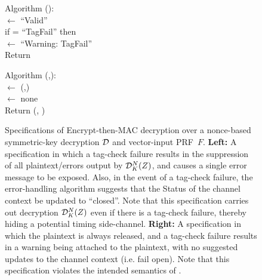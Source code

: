 \begin{figure}
{\medskip
Algorithm ():\\
\nudge {} $\gets$ ``Valid''\\
\nudge if  =  ``TagFail'' then\\ 
\nudge\nudge {} $\gets$ ``Warning: TagFail''\\
\nudge Return 

\medskip
Algorithm (,):\\
\nudge {} $\gets$ (,)\\
\nudge {} $\gets$ none \\
\nudge Return (, )
} 
\caption{Specifications of Encrypt-then-MAC decryption over a nonce-based
  symmetric-key decryption $\mathcal{D}$ and vector-input PRF~$F$.  {\bf
    Left:} A specification in which a tag-check failure results in the
suppression of all plaintext/errors output by $\mathcal{D}^N_K(Z)$, and
causes a single error message to be exposed.  Also,
in the event of a tag-check failure, the error-handling algorithm
suggests that the Status of the channel context be updated to
``closed''.  Note that this specification carries out decryption
$\mathcal{D}^N_K(Z)$ even if there is a tag-check failure, thereby hiding a
potential timing side-channel. 
%
{\bf
  Right: } A specification in which the plaintext is always released,
and a tag-check failure results in a warning being attached to the
plaintext, with no suggested updates to the channel context
(i.e. fail open).  Note that this specification violates the intended
semantics of .}
\label{fig:EtM-aead}
\end{figure}
